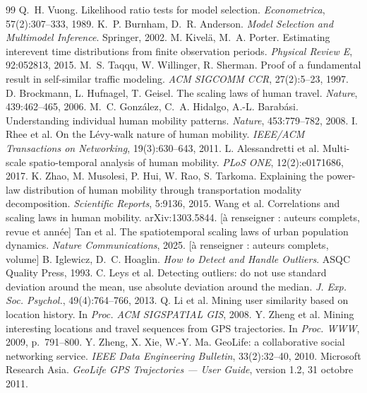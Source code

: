\documentclass[12pt,a4paper]{report}
\theoremstyle{definition}
\newcommand{\arenseigner}[1]{\textcolor{red!70!black}{[à renseigner : #1]}}
\begin{document}
\begin{thebibliography}{99}
 Q.~H. Vuong. Likelihood ratio tests for model selection. \textit{Econometrica}, 57(2):307--333, 1989.
 K.~P. Burnham, D.~R. Anderson. \textit{Model Selection and Multimodel Inference}. Springer, 2002.
 M. Kivelä, M.~A. Porter. Estimating interevent time distributions from finite observation periods. \textit{Physical Review E}, 92:052813, 2015.
 M.~S. Taqqu, W. Willinger, R. Sherman. Proof of a fundamental result in self-similar traffic modeling. \textit{ACM SIGCOMM CCR}, 27(2):5--23, 1997.
 D. Brockmann, L. Hufnagel, T. Geisel. The scaling laws of human travel. \textit{Nature}, 439:462--465, 2006.
 M.~C. González, C.~A. Hidalgo, A.-L. Barabási. Understanding individual human mobility patterns. \textit{Nature}, 453:779--782, 2008.
 I. Rhee et al. On the Lévy-walk nature of human mobility. \textit{IEEE/ACM Transactions on Networking}, 19(3):630--643, 2011.
 L. Alessandretti et al. Multi-scale spatio-temporal analysis of human mobility. \textit{PLoS ONE}, 12(2):e0171686, 2017.
 K. Zhao, M. Musolesi, P. Hui, W. Rao, S. Tarkoma. Explaining the power-law distribution of human mobility through transportation modality decomposition. \textit{Scientific Reports}, 5:9136, 2015.
 Wang et al. Correlations and scaling laws in human mobility. arXiv:1303.5844. \arenseigner{auteurs complets, revue et année}
 Tan et al. The spatiotemporal scaling laws of urban population dynamics. \textit{Nature Communications}, 2025. \arenseigner{auteurs complets, volume}
 B. Iglewicz, D.~C. Hoaglin. \textit{How to Detect and Handle Outliers}. ASQC Quality Press, 1993.
 C. Leys et al. Detecting outliers: do not use standard deviation around the mean, use absolute deviation around the median. \textit{J. Exp. Soc. Psychol.}, 49(4):764--766, 2013.
 Q. Li et al. Mining user similarity based on location history. In \textit{Proc. ACM SIGSPATIAL GIS}, 2008.
 Y. Zheng et al. Mining interesting locations and travel sequences from GPS trajectories. In \textit{Proc. WWW}, 2009, p.~791--800.
 Y. Zheng, X. Xie, W.-Y. Ma. GeoLife: a collaborative social networking service. \textit{IEEE Data Engineering Bulletin}, 33(2):32--40, 2010.
 Microsoft Research Asia. \textit{GeoLife GPS Trajectories --- User Guide}, version 1.2, 31 octobre 2011.

\end{thebibliography}
\end{document}
